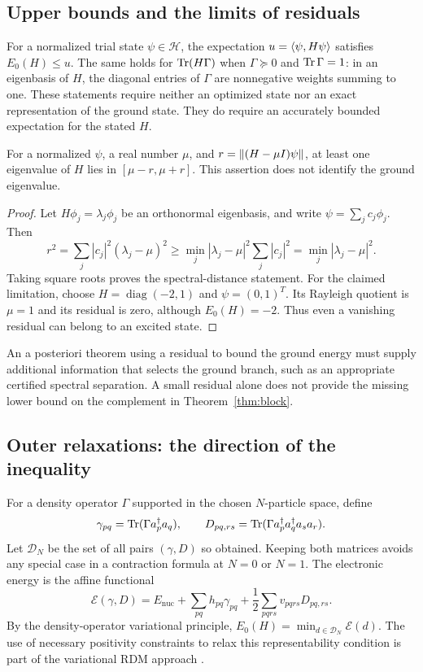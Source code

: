 \subsection{Upper bounds and the limits of residuals}
For a normalized trial state $\psi\in\mathcal H$, the expectation
$u=\left\langle \psi,H\psi\right\rangle$ satisfies $E_0(H)\le u$. The same holds for
$\operatorname{Tr}(H\Gamma)$ when $\Gamma\succeq0$ and $\operatorname{Tr}\Gamma=1$: in an
eigenbasis of $H$, the diagonal entries of $\Gamma$ are nonnegative
weights summing to one. These statements require neither an optimized state
nor an exact representation of the ground state. They do require an
accurately bounded expectation for the stated $H$.

\begin{proposition}
\label{prop:residual}
For a normalized $\psi$, a real number $\mu$, and
$r=\left\lVert (H-\mu I)\psi\right\rVert$, at least one eigenvalue of $H$ lies in
$[\mu-r,\mu+r]$. This assertion does not identify the ground eigenvalue.
\end{proposition}
\begin{proof}
Let $H\phi_j=\lambda_j\phi_j$ be an orthonormal eigenbasis, and write
$\psi=\sum_j c_j\phi_j$. Then
\[
 r^2=\sum_j|c_j|^2(\lambda_j-\mu)^2
 \ge\min_j|\lambda_j-\mu|^2\sum_j|c_j|^2
 =\min_j|\lambda_j-\mu|^2.
\]
Taking square roots proves the spectral-distance statement. For the claimed
limitation, choose $H=\operatorname{diag}(-2,1)$ and $\psi=(0,1)^T$.
Its Rayleigh quotient is $\mu=1$ and its residual is zero, although
$E_0(H)=-2$. Thus even a vanishing residual can belong to an excited state.
\end{proof}

An a posteriori theorem using a residual to bound the ground energy must
supply additional information that selects the ground branch, such as an
appropriate certified spectral separation. A small residual alone does not
provide the missing lower bound on the complement in
Theorem~\ref{thm:block}.

\subsection{Outer relaxations: the direction of the inequality}
For a density operator $\Gamma$ supported in the chosen $N$-particle
space, define
\[
 \gamma_{pq}=\operatorname{Tr}(\Gamma a_p^\dagger a_q),\qquad
 D_{pq,rs}=\operatorname{Tr}(\Gamma a_p^\dagger a_q^\dagger a_s a_r).
\]
Let $\mathcal D_N$ be the set of all pairs $(\gamma,D)$ so obtained.
Keeping both matrices avoids any special case in a contraction formula at
$N=0$ or $N=1$. The electronic energy is the affine functional
\[
 \mathcal E(\gamma,D)=E_{\mathrm{nuc}}+
 \sum_{pq}h_{pq}\gamma_{pq}+\frac12\sum_{pqrs}v_{pqrs}D_{pq,rs}.
\]
By the density-operator variational principle,
$E_0(H)=\min_{d\in\mathcal D_N}\mathcal E(d)$.
The use of necessary positivity constraints to relax this representability
condition is part of the variational RDM approach \citep{Mazziotti2012}.

